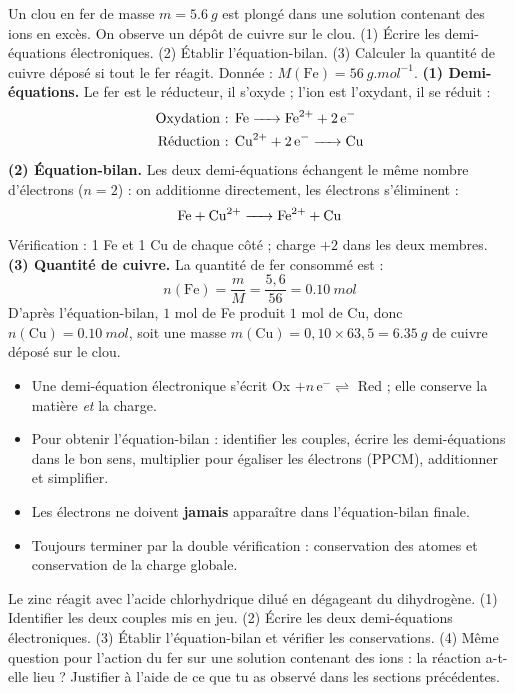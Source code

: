 \documentclass[11pt]{article}
\newcommand{\cle}[1]{{\popxbold\color{popdark}#1}}
\begin{document}
\begin{exoresolu}
Un clou en fer de masse $m = \SI{5,6}{g}$ est plongé dans une solution contenant des ions  en excès. On observe un dépôt de cuivre sur le clou. (1) Écrire les demi-équations électroniques. (2) Établir l'équation-bilan. (3) Calculer la quantité de cuivre déposé si tout le fer réagit. Donnée : $M(\text{Fe}) = \SI{56}{g.mol^{-1}}$.
\tcblower
\textbf{(1) Demi-équations.} Le fer est le réducteur, il s'oxyde ; l'ion  est l'oxydant, il se réduit :
\begin{align*}
\text{Oxydation : } & \ce{Fe -> Fe^2+ + 2e-} \\
\text{Réduction : } & \ce{Cu^2+ + 2e- -> Cu}
\end{align*}
\textbf{(2) Équation-bilan.} Les deux demi-équations échangent le même nombre d'électrons ($n = 2$) : on additionne directement, les électrons s'éliminent :
\[ \ce{Fe + Cu^2+ -> Fe^2+ + Cu} \]
Vérification : 1 Fe et 1 Cu de chaque côté ; charge $+2$ dans les deux membres.
\textbf{(3) Quantité de cuivre.} La quantité de fer consommé est :
\[ n(\text{Fe}) = \frac{m}{M} = \frac{5,6}{56} = \SI{0,10}{mol} \]
D'après l'équation-bilan, $1$ mol de Fe produit $1$ mol de Cu, donc $n(\text{Cu}) = \SI{0,10}{mol}$, soit une masse $m(\text{Cu}) = 0,10 \times 63,5 = \SI{6,35}{g}$ de cuivre déposé sur le clou.
\end{exoresolu}

\begin{aretenir}
\begin{itemize}
\item Une \cle{demi-équation électronique} s'écrit Ox $+ n\,\text{e}^- \rightleftharpoons$ Red ; elle conserve la matière \emph{et} la charge.
\item Pour obtenir l'\cle{équation-bilan} : identifier les couples, écrire les demi-équations dans le bon sens, multiplier pour égaliser les électrons (PPCM), additionner et simplifier.
\item Les électrons ne doivent \textbf{jamais} apparaître dans l'équation-bilan finale.
\item Toujours terminer par la double vérification : conservation des atomes et conservation de la charge globale.
\end{itemize}
\end{aretenir}

\begin{exercice}
Le zinc réagit avec l'acide chlorhydrique dilué en dégageant du dihydrogène. (1) Identifier les deux couples mis en jeu. (2) Écrire les deux demi-équations électroniques. (3) Établir l'équation-bilan et vérifier les conservations. (4) Même question pour l'action du fer sur une solution contenant des ions  : la réaction a-t-elle lieu ? Justifier à l'aide de ce que tu as observé dans les sections précédentes.
\end{exercice}
\end{document}
